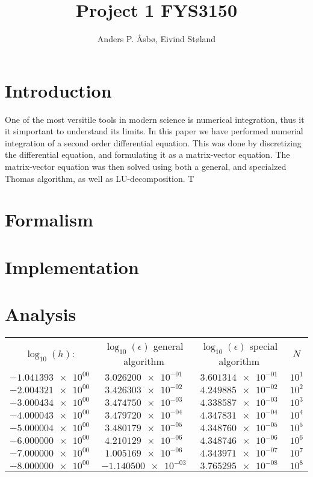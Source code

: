 \documentclass[english,notitlepage,preprint]{revtex4-1}  %
\begin{document}
\title{Project 1 FYS3150}   %
\author{Anders P. Åsbø, Eivind Støland}               %

\noaffiliation                            %

\maketitle
\tableofcontents

\section{Introduction} \label{sec:I}
One of the most versitile tools in modern science is numerical integration, thus it it simportant to understand its limits. In this paper we have performed numerial integration of a second order differential equation. This was done by discretizing the differential equation, and formulating it as a matrix-vector equation. The matrix-vector equation was then solved using both a general, and specialzed Thomas algorithm, as well as LU-decomposition. T

\section{Formalism} \label{sec:II}

\section{Implementation} \label{sec:III}

\section{Analysis} \label{sec:IV}
\begin{center}
	\begin{tabular}{|c|c|c|c|}
		\(\log_{10}(h)\): & \(\log_{10}(\epsilon)\) general algorithm & \(\log_{10}(\epsilon)\) special algorithm & \(N\) \\
		\(\num{-1.041393e+00}\) & \(\num{3.026200e-01}\) & \(\num{3.601314e-01}\) & \(10^{1}\) \\
		\(\num{-2.004321e+00}\) & \(\num{3.426303e-02}\) & \(\num{4.249885e-02}\) & \(10^{2}\) \\
		\(\num{-3.000434e+00}\) & \(\num{3.474750e-03}\) & \(\num{4.338587e-03}\) & \(10^{3}\) \\
		\(\num{-4.000043e+00}\) & \(\num{3.479720e-04}\) & \(\num{4.347831e-04}\) & \(10^{4}\) \\
		\(\num{-5.000004e+00}\) & \(\num{3.480179e-05}\) & \(\num{4.348760e-05}\) & \(10^{5}\) \\
		\(\num{-6.000000e+00}\) & \(\num{4.210129e-06}\) & \(\num{4.348746e-06}\) & \(10^{6}\) \\
		\(\num{-7.000000e+00}\) & \(\num{1.005169e-06}\) & \(\num{4.343971e-07}\) & \(10^{7}\) \\
		\(\num{-8.000000e+00}\) & \(\num{-1.140500e-03}\) & \(\num{3.765295e-08}\) & \(10^{8}\)
	\end{tabular}
\end{center}
\end{document}

